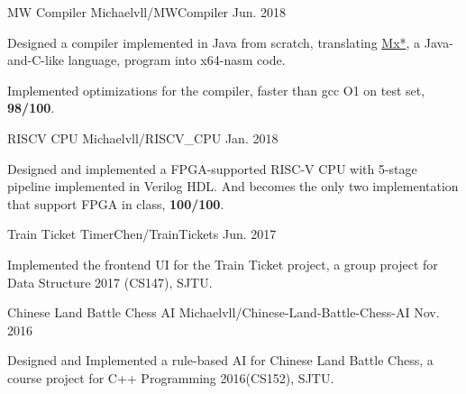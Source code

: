 


\begin{cventries}

\cvproject
{MW Compiler}
{Michaelvll/MWCompiler}
{Jun. 2018}
{
	\begin{cvitems}
        \item {Designed a compiler implemented in Java from scratch, translating \href{https://acm.sjtu.edu.cn/w/images/3/30/M_language_manual.pdf}{Mx*}, a Java-and-C-like language, program into x64-nasm code.}
        \item {Implemented optimizations for the compiler, faster than gcc O1 on test set, \textbf{98/100}.}
	\end{cvitems}
}

\cvproject
{RISCV CPU}
{Michaelvll/RISCV\_CPU}
{Jan. 2018}
{
	\begin{cvitems}
		\item {Designed and implemented a FPGA-supported RISC-V CPU with 5-stage pipeline implemented in Verilog HDL. And becomes the only two implementation that support FPGA in class, \textbf{100/100}.}
	\end{cvitems}
}

\cvproject
{Train Ticket}
{TimerChen/TrainTickets}
{Jun. 2017}
{
    \begin{cvitems}
        \item {Implemented the frontend UI for the Train Ticket project, a group project for Data Structure 2017 (CS147), SJTU.}
    \end{cvitems}
}
    
\cvproject
{Chinese Land Battle Chess AI}
{Michaelvll/Chinese-Land-Battle-Chess-AI}
{Nov. 2016}
{
    \begin{cvitems}
        \item {Designed and Implemented a rule-based AI for Chinese Land Battle Chess, a  course project for  C++ Programming 2016(CS152), SJTU.}
    \end{cvitems}
}

\end{cventries}